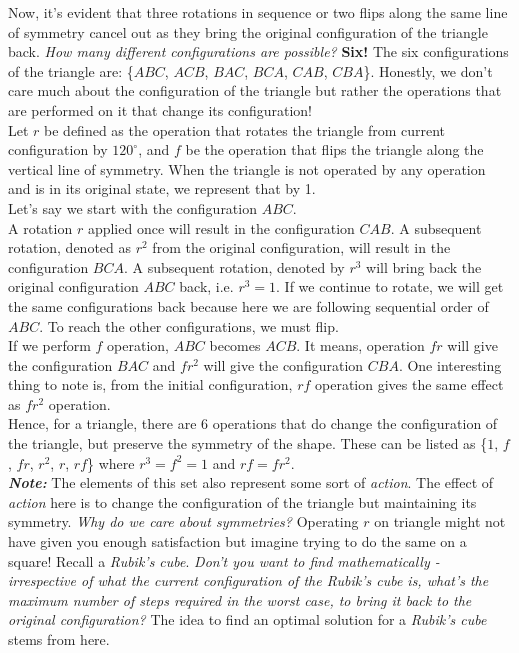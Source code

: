 Now, it's evident that three rotations in sequence or two flips along the same line of symmetry cancel out as they bring the original configuration of the triangle back. \textit{How many different configurations are possible?} \textbf{Six!} The six configurations of the triangle are: \{$ABC$, $ACB$, $BAC$, $BCA$, $CAB$, $CBA$\}. Honestly, we don't care much about the configuration of the triangle but rather the operations that are performed on it that change its configuration! \\

Let $r$ be defined as the operation that rotates the triangle from current configuration by \( 120^\circ \), and $f$ be the operation that flips the triangle along the vertical line of symmetry. When the triangle is not operated by any operation and is in its original state, we represent that by 1. \\

Let's say we start with the configuration $ABC$. \\

A rotation $r$ applied once will result in the configuration $CAB$. A subsequent rotation, denoted as $r^2$ from the original configuration, will result in the configuration $BCA$. A subsequent rotation, denoted by $r^3$ will bring back the original configuration $ABC$ back, i.e. $r^3=1$. If we continue to rotate, we will get the same configurations back because here we are following sequential order of $ABC$. To reach the other configurations, we must flip. \\

If we perform $f$ operation, $ABC$ becomes $ACB$. It means, operation $fr$ will give the configuration $BAC$ and $fr^2$ will give the configuration $CBA$. One interesting thing to note is, from the initial configuration, $rf$ operation gives the same effect as $fr^2$ operation. \\

Hence, for a triangle, there are 6 operations that do change the configuration of the triangle, but preserve the symmetry of the shape. These can be listed as \{$1$, $f$, $fr$, $r^2$, $r$, $rf$\} where $r^3=f^2=1$ and $rf = fr^2$. \\

\textit{\textbf{Note:}} The elements of this set also represent some sort of \textit{action}. The effect of \textit{action} here is to change the configuration of the triangle but maintaining its symmetry. \textit{Why do we care about symmetries?} Operating $r$ on triangle might not have given you enough satisfaction but imagine trying to do the same on a square! Recall a \textit{Rubik's cube}. \textit{Don't you want to find mathematically - irrespective of what the current configuration of the Rubik's cube is, what's the maximum number of steps required in the worst case, to bring it back to the original configuration?} The idea to find an optimal solution for a \textit{Rubik's cube} stems from here. \\

